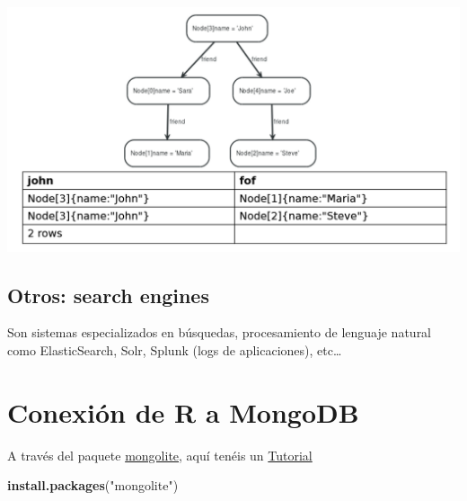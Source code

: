 \documentclass[
]{book}
\newenvironment{Shaded}{\begin{snugshade}}{\end{snugshade}}
\newcommand{\AttributeTok}[1]{\textcolor[rgb]{0.13,0.29,0.53}{#1}}
\newcommand{\CommentTok}[1]{\textcolor[rgb]{0.56,0.35,0.01}{\textit{#1}}}
\newcommand{\FunctionTok}[1]{\textcolor[rgb]{0.13,0.29,0.53}{\textbf{#1}}}
\newcommand{\NormalTok}[1]{#1}
\newcommand{\OtherTok}[1]{\textcolor[rgb]{0.56,0.35,0.01}{#1}}
\newcommand{\SpecialCharTok}[1]{\textcolor[rgb]{0.81,0.36,0.00}{\textbf{#1}}}
\newcommand{\StringTok}[1]{\textcolor[rgb]{0.31,0.60,0.02}{#1}}
\begin{document}
\includegraphics{images/CypherResult.png}

\hypertarget{otros-search-engines}{%
\subsection{Otros: search engines}\label{otros-search-engines}}

Son sistemas especializados en búsquedas, procesamiento de lenguaje natural como ElasticSearch, Solr, Splunk (logs de aplicaciones), etc\ldots{}

\hypertarget{conexiuxf3n-de-r-a-mongodb}{%
\section{Conexión de R a MongoDB}\label{conexiuxf3n-de-r-a-mongodb}}

A través del paquete \href{https://cran.rstudio.com/web/packages/mongolite/mongolite.pdf}{mongolite}, aquí tenéis un \href{https://datascienceplus.com/using-mongodb-with-r/}{Tutorial}

\begin{Shaded}
\begin{Highlighting}[]
\FunctionTok{install.packages}\NormalTok{(}\StringTok{"mongolite"}\NormalTok{)}
\end{Highlighting}
\end{Shaded}

\begin{Shaded}
\end{Shaded}
\end{document}
